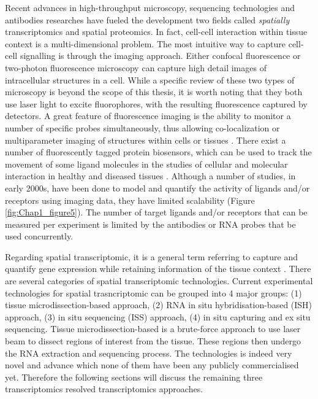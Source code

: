 Recent advances in high-throughput microscopy, sequencing technologies and antibodies researches have fueled the development two fields called \textit{spatially} transcriptomics and spatial proteomics. In fact, cell-cell interaction within tissue context is a multi-dimensional problem. The most intuitive way to capture cell-cell signalling is through the imaging approach. Either confocal fluorescence or two-photon fluorescence microscopy can capture high detail images of intracellular structures in a cell. While a specific review of these two types of microscopy is beyond the scope of this thesis, it is worth noting that they both use laser light to excite fluorophores, with the resulting fluorescence captured by detectors. A great feature of fluorescence imaging is the ability to monitor a number of specific probes simultaneously, thus allowing co-localization or multiparameter imaging of structures within cells or tissues \cite{periasamy2013methods}. There exist a number of fluorescently tagged protein biosensors, which can be used to track the movement of some ligand molecules in the studies of cellular and molecular interaction in healthy and diseased tissues \cite{gerdes2013cell}. Although a number of studies, in early 2000s, have been done to model and quantify the activity of ligands and/or receptors \cite{awaji1998real, go1997quantitative, maamra1999studies, sneddon2003activation, bohme2009illuminating} using imaging data, they have limited scalability (Figure \ref{fig:Chap1_figure5}). The number of target ligands and/or receptors that can be measured per experiment is limited by the antibodies or RNA probes that be used concurrently.    

Regarding spatial transcriptomic, it is a general term referring to capture and quantify gene expression while retaining information of the tissue context \cite{burgess2019spatial}. There are several categories of spatial transcriptomic technologies. Current experimental technologies for spatial trasncriptomic can be grouped into 4 major groups: (1) tissue microdissection-based approach, (2) RNA in situ hybridisation-based (ISH) approach, (3) in situ sequencing (ISS) approach, (4) in situ capturing and ex situ sequencing. Tissue microdissection-based is a brute-force approach to use laser beam to dissect regions of interest from the tissue. These regions then undergo the RNA extraction and sequencing process. The technologies is indeed very novel and advance which none of them have been any publicly commercialised yet. Therefore the following sections will discuss the remaining three transcriptomics resolved transcriptomics approaches.

